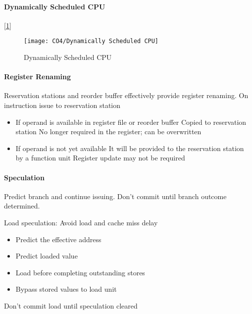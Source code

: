 \paragraph{Dynamically Scheduled CPU}
[\ref{Dynamically Scheduled CPU}]
\begin{figure}[!htb]
    \centering
    \texttt{[image: CO4/Dynamically Scheduled CPU]}
    \caption{Dynamically Scheduled CPU}
    \label{Dynamically Scheduled CPU}
\end{figure}


\paragraph{Register Renaming}
Reservation stations and reorder buffer effectively provide register renaming. On instruction issue to reservation station
\begin{itemize}\small 
    \item If operand is available in register file or reorder
    buffer
    \subitem Copied to reservation station
    \subitem No longer required in the register; can be overwritten
    \item  If operand is not yet available
    \subitem It will be provided to the reservation station by a function unit
    \subitem Register update may not be required
\end{itemize}

\paragraph{Speculation}
Predict branch and continue issuing. Don't commit until branch outcome determined. 

Load speculation: Avoid load and cache miss delay
\begin{itemize}\small
    \item Predict the effective address
    \item Predict loaded value
    \item Load before completing outstanding stores
    \item Bypass stored values to load unit
\end{itemize}
Don't commit load until speculation cleared

